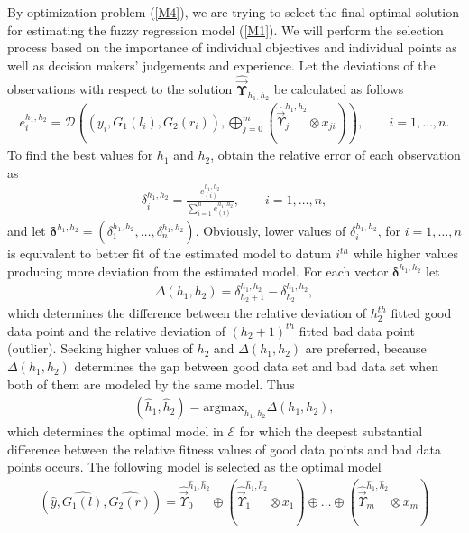 \documentclass{IJFS}
\begin{document}
By optimization problem (\ref{M4}), we are trying to select the final optimal solution for estimating the fuzzy regression model (\ref{M1}).
We will perform the selection process based on the importance of individual objectives and individual points as well as decision makers' judgements and experience.
Let the deviations of the observations with respect to the solution $\widehat{{\vec{\boldsymbol\Upsilon}}}_{h_1,h_2}$ be calculated as follows
\begin{eqnarray*}
e_i^{h_1,h_2}=\mathcal{D}\left((y_i,G_1(l_i),G_2(r_i)), \bigoplus_{j=0}^m(\widehat{\vec{\Upsilon}}^{h_1,h_2}_j\otimes x_{ji})\right), \qquad i=1,\ldots,n.
\end{eqnarray*}
To find the best values for $h_1$ and $h_2$, obtain the relative error of each observation as
\begin{eqnarray*}
\delta_i^{h_1,h_2}  = \frac{e^{h_1,h_2}_{(i)}}{\sum_{i=1}^n e^{h_1,h_2}_{(i)}}, \qquad i=1,\ldots,n,
\end{eqnarray*}
and let $\boldsymbol{\delta}^{h_1,h_2}=(\delta_1^{h_1,h_2},\ldots,\delta_n^{h_1,h_2})$.
Obviously,
lower values of $\delta_i^{h_1,h_2}$, for $i=1,\ldots,n$ is   equivalent to better fit of the estimated model to datum $i^{th}$ while
higher values producing more deviation from the estimated model.
For each vector $\boldsymbol{\delta}^{h_1,h_2}$   let
\begin{eqnarray*}
\Delta(h_1,h_2)=\delta_{h_2+1}^{h_1,h_2}-\delta_{h_2}^{h_1,h_2},
\end{eqnarray*}
which determines the difference between the relative deviation of $h_2^{th}$ fitted good data point and the relative deviation of $(h_2+1)^{th}$ fitted bad data point (outlier).
Seeking higher values of $h_2$ and $\Delta(h_1,h_2)$ are preferred,
because $\Delta(h_1,h_2)$ determines the gap between good data set and bad data set when both of them are modeled by the same model.
Thus
\begin{eqnarray*}
(\widehat{h}_1,\widehat{h}_2)=\textrm{argmax}_{h_1,h_2}\Delta(h_1,h_2),
\end{eqnarray*}
which determines the optimal model in $\mathcal{E}$ for which the deepest substantial difference between the relative fitness values of good data points and bad data points occurs.
The following model is selected as the  optimal model
\begin{eqnarray}\label{E4}
(\widehat{y},\widehat{G_1(l)},\widehat{G_2(r)})= \widehat{\vec{\Upsilon}}_0^{\widehat{h}_1,\widehat{h}_2}\oplus(\widehat{\vec{\Upsilon}}_1^{\widehat{h}_1,\widehat{h}_2} \otimes x_{1}) \oplus\ldots \oplus(\widehat{\vec{\Upsilon}}_m^{\widehat{h}_1,\widehat{h}_2}\otimes x_{m})
\end{eqnarray}
\end{document}
